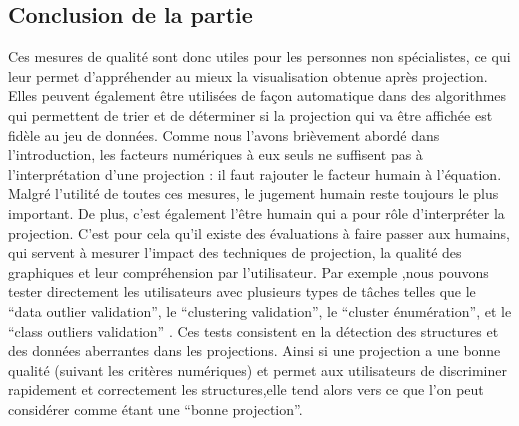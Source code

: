 \subsection{Conclusion de la partie} 
Ces mesures de qualité sont donc utiles pour les personnes non spécialistes, ce qui leur permet d’appréhender au mieux la visualisation obtenue après projection.
Elles peuvent également être utilisées de façon automatique dans des algorithmes qui permettent de trier et de déterminer si la projection qui va être affichée est fidèle au jeu de données\cite{bertini2011quality-AutomatisationAlgo}. 
\newline
Comme nous l’avons brièvement abordé dans l'introduction, les facteurs numériques à eux seuls ne suffisent pas à l’interprétation d’une projection : il faut rajouter le facteur humain à l’équation.
Malgré l’utilité de toutes ces mesures, le jugement humain reste toujours le plus important\cite{AndradaTatu2010visual}. De plus, c'est également l’être humain qui a pour rôle d’interpréter la projection.  C’est pour cela qu’il existe des évaluations à faire passer aux humains, qui servent à mesurer l’impact des techniques de projection, la qualité des graphiques et leur compréhension par l’utilisateur. Par exemple ,nous pouvons tester directement les utilisateurs avec plusieurs types de tâches telles que le “data outlier validation”, le “clustering validation”, le “cluster énumération”, et le “class outliers validation” \cite{HeulotAnEvaluation}. 
Ces tests consistent en la détection des structures et des données aberrantes dans les projections.
Ainsi si une projection a une bonne qualité (suivant les critères numériques) et permet aux utilisateurs de discriminer rapidement et correctement les structures,elle tend alors vers ce que l’on peut considérer comme étant une “bonne projection”.
 





